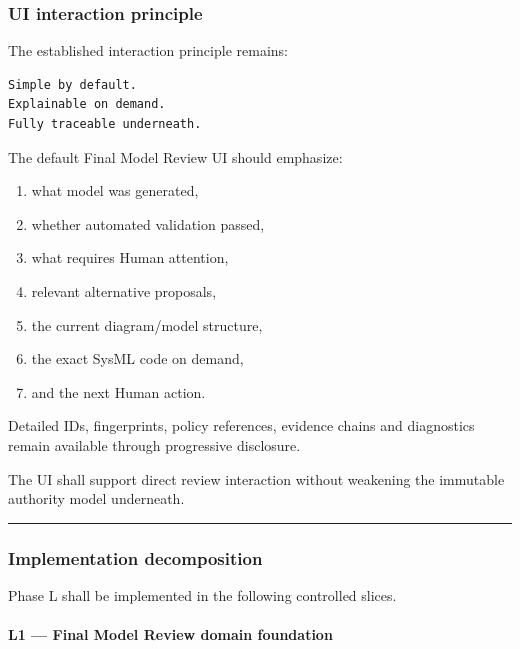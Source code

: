\hypertarget{ui-interaction-principle}{%
\subsubsection{UI interaction principle}\label{ui-interaction-principle}}

The established interaction principle remains:

\begin{verbatim}
Simple by default.
Explainable on demand.
Fully traceable underneath.
\end{verbatim}

The default Final Model Review UI should emphasize:

\begin{enumerate}
\def\labelenumi{\arabic{enumi}.}
\tightlist
\item
  what model was generated,
\item
  whether automated validation passed,
\item
  what requires Human attention,
\item
  relevant alternative proposals,
\item
  the current diagram/model structure,
\item
  the exact SysML code on demand,
\item
  and the next Human action.
\end{enumerate}

Detailed IDs, fingerprints, policy references, evidence chains and diagnostics remain available through progressive disclosure.

The UI shall support direct review interaction without weakening the immutable authority model underneath.

\begin{center}\rule{0.5\linewidth}{0.5pt}\end{center}

\hypertarget{implementation-decomposition}{%
\subsubsection{Implementation decomposition}\label{implementation-decomposition}}

Phase L shall be implemented in the following controlled slices.

\hypertarget{l1--final-model-review-domain-foundation}{%
\paragraph{L1 --- Final Model Review domain foundation}\label{l1--final-model-review-domain-foundation}}

